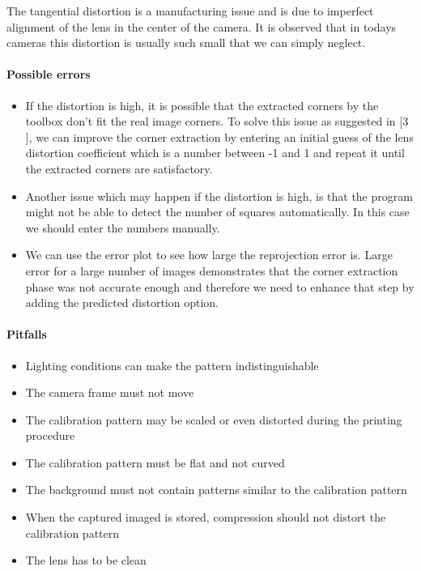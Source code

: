 \documentclass{scrartcl}
\begin{document}
The tangential distortion is a manufacturing issue and  is due to imperfect alignment of the lens in the center of the camera. It is observed that in todays cameras this distortion is usually such small that we can simply neglect.



\paragraph{Possible errors}
\begin{itemize}
\item If the distortion is high, it is possible that the extracted corners by the toolbox don't fit the real image corners. To solve this issue as suggested in [3 ], we can improve the corner extraction by entering an initial guess of the lens distortion coefficient which is a number between -1 and 1 and repeat it until the extracted corners are satisfactory.



\item Another issue which may happen if the distortion is high, is that the program might not be able to detect the number of squares automatically. In this case we should enter the numbers manually.

\item We can use the error plot to see how large the reprojection error is. Large error for a large number of images demonstrates that the corner extraction phase was not accurate enough and therefore we need to enhance that step by adding the predicted distortion option.

\end{itemize}

\paragraph{Pitfalls}
\begin{itemize}
\item Lighting conditions can make the pattern indistinguishable
\item The camera frame must not move
\item The calibration pattern may be scaled or even distorted during the printing procedure
\item The calibration pattern must be flat and not curved
\item The background must not contain patterns similar to the calibration pattern
\item When the captured imaged is stored, compression should not distort the calibration pattern
\item The lens has to be clean
\end{itemize}
\end{document}
